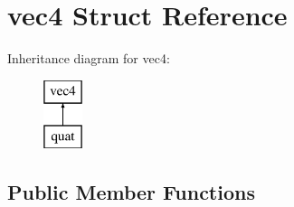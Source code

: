 \hypertarget{structvec4}{}\section{vec4 Struct Reference}
\label{structvec4}
Inheritance diagram for vec4\+:\begin{figure}[H]
\begin{center}
\leavevmode
\includegraphics[height=2.000000cm]{structvec4}
\end{center}
\end{figure}
\subsection*{Public Member Functions}
